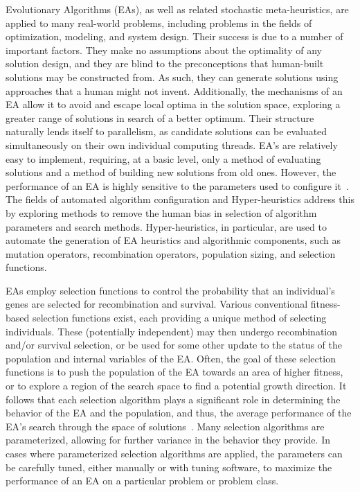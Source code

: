 \documentclass[times,12pt,titlepage]{mstogs}
\begin{document}
\begin{ThesisBody}

\label{Introduction}
Evolutionary Algorithms (EAs), as well as related stochastic meta-heuristics, are applied to many real-world problems, including problems in the fields of optimization, modeling, and system design. Their success is due to a number of important factors. They make no assumptions about the optimality of any solution design, and they are blind to the preconceptions that human-built solutions may be constructed from. As such, they can generate solutions using approaches that a human might not invent. Additionally, the mechanisms of an EA allow it to avoid and escape local optima in the solution space, exploring a greater range of solutions in search of a better optimum. Their structure naturally lends itself to parallelism, as candidate solutions can be evaluated simultaneously on their own individual computing threads. EA's are relatively easy to implement, requiring, at a basic level, only a method of evaluating solutions and a method of building new solutions from old ones. However, the performance of an EA is highly sensitive to the parameters used to configure it~\citep{eiben1999parameter}. The fields of automated algorithm configuration and Hyper-heuristics address this by exploring methods to remove the human bias in selection of algorithm parameters and search methods. Hyper-heuristics, in particular, are used to automate the generation of EA heuristics and algorithmic components, such as mutation operators, recombination operators, population sizing, and selection functions.

EAs employ selection functions to control the probability that an individual's genes are selected for recombination and survival. Various conventional fitness-based selection functions exist, each providing a unique method of selecting individuals. These (potentially independent) may then undergo recombination and/or survival selection, or be used for some other update to the status of the population and internal variables of the EA. Often, the goal of these selection functions is to push the population of the EA towards an area of higher fitness, or to explore a region of the search space to find a potential growth direction. It follows that each selection algorithm plays a significant role in determining the behavior of the EA and the population, and thus, the average performance of the EA's search through the space of solutions~\citep{woodward2010metaBias}. Many selection algorithms are parameterized, allowing for further variance in the behavior they provide. In cases where parameterized selection algorithms are applied, the parameters can be carefully tuned, either manually or with tuning software, to maximize the performance of an EA on a particular problem or problem class.


\end{ThesisBody}
\end{document}
